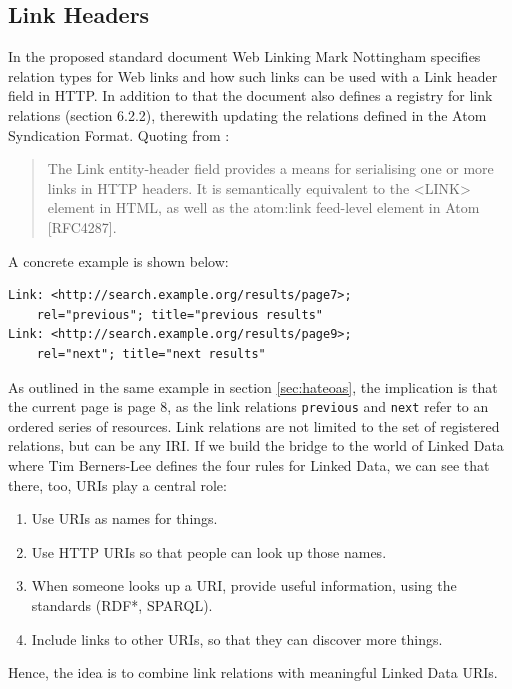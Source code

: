 \documentclass{acm_proc_article-sp}
\begin{document}
\subsection{Link Headers}\label{sec:linkheaders}
In the proposed standard document Web Linking\cite{Link:Headers} Mark Nottingham specifies relation types for Web links and how such links can be used with a Link header field in HTTP. In addition to that the document also defines a registry for link relations (section 6.2.2), therewith updating the relations defined in the Atom Syndication Format. Quoting from \cite{Link:Headers}:
\begin{quote}
The Link entity-header field provides a means for serialising one or more links in HTTP headers.  It is semantically equivalent to the <LINK> element in HTML, as well as the atom:link feed-level element in Atom [RFC4287].
\end{quote}
A concrete example is shown below:
\begin{lstlisting}
Link: <http://search.example.org/results/page7>;
    rel="previous"; title="previous results"
Link: <http://search.example.org/results/page9>;
    rel="next"; title="next results"
\end{lstlisting}
As outlined in the same example in section \ref{sec:hateoas}, the implication is that the current page is page 8, as the link relations \texttt{previous} and \texttt{next} refer to an ordered series of resources. Link relations are not limited to the set of registered relations, but can be any IRI. If we build the bridge to the world of Linked Data\cite{TimBL:LinkedData} where Tim Berners-Lee defines the four rules for Linked Data, we can see that there, too, URIs play a central role:
\begin{enumerate}
\item Use URIs as names for things.
\item Use HTTP URIs so that people can look up those names.
\item When someone looks up a URI, provide useful information, using the standards (RDF*, SPARQL).
\item Include links to other URIs, so that they can discover more things.
\end{enumerate}
Hence, the idea is to combine link relations with meaningful Linked Data URIs.
\end{document}
